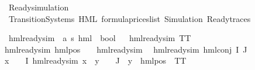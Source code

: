 %
\begin{isabellebody}%
%
%
\isadelimtheory
%
\endisadelimtheory
%
\isatagtheory
{}\isamarkupfalse%
\ Ready{\isacharunderscore}{\kern0pt}simulation\isanewline
{}\ Transition{\isacharunderscore}{\kern0pt}Systems\ HML\ formula{\isacharunderscore}{\kern0pt}prices{\isacharunderscore}{\kern0pt}list\ Simulation\ Ready{\isacharunderscore}{\kern0pt}traces\isanewline
{}%
\endisatagtheory
{\isafoldtheory}%
%
\isadelimtheory
%
\endisadelimtheory
%
\isadelimdocument
%
\endisadelimdocument
%
\isatagdocument
%
\isamarkuptrue%
%
\endisatagdocument
{\isafolddocument}%
%
\isadelimdocument
%
\endisadelimdocument
%
\begin{isamarkuptext}%
%
\end{isamarkuptext}\isamarkuptrue%
%
\begin{isamarkuptext}%
%
\end{isamarkuptext}\isamarkuptrue%
\isamarkupfalse%
\ hml{\isacharunderscore}{\kern0pt}ready{\isacharunderscore}{\kern0pt}sim\ {\isacharcolon}{\kern0pt}{\isacharcolon}{\kern0pt}\ {\isachardoublequoteopen}{\isacharparenleft}{\kern0pt}{\isacharprime}{\kern0pt}a{\isacharcomma}{\kern0pt}\ {\isacharprime}{\kern0pt}s{\isacharparenright}{\kern0pt}\ hml\ {\isasymRightarrow}\ bool{\isachardoublequoteclose}\isanewline
\ \ \isanewline
{\isachardoublequoteopen}hml{\isacharunderscore}{\kern0pt}ready{\isacharunderscore}{\kern0pt}sim\ TT{\isachardoublequoteclose}\ {\isacharbar}{\kern0pt}\isanewline
{\isachardoublequoteopen}hml{\isacharunderscore}{\kern0pt}ready{\isacharunderscore}{\kern0pt}sim\ {\isacharparenleft}{\kern0pt}hml{\isacharunderscore}{\kern0pt}pos\ {\isasymalpha}\ {\isasymphi}{\isacharparenright}{\kern0pt}{\isachardoublequoteclose}\ \ {\isachardoublequoteopen}hml{\isacharunderscore}{\kern0pt}ready{\isacharunderscore}{\kern0pt}sim\ {\isasymphi}{\isachardoublequoteclose}\ {\isacharbar}{\kern0pt}\isanewline
{\isachardoublequoteopen}hml{\isacharunderscore}{\kern0pt}ready{\isacharunderscore}{\kern0pt}sim\ {\isacharparenleft}{\kern0pt}hml{\isacharunderscore}{\kern0pt}conj\ I\ J\ {\isasymPhi}{\isacharparenright}{\kern0pt}{\isachardoublequoteclose}\ \ \isanewline
{\isachardoublequoteopen}{\isacharparenleft}{\kern0pt}{\isasymforall}x\ {\isasymin}\ {\isacharparenleft}{\kern0pt}{\isasymPhi}\ {\isacharbackquote}{\kern0pt}\ I{\isacharparenright}{\kern0pt}{\isachardot}{\kern0pt}\ hml{\isacharunderscore}{\kern0pt}ready{\isacharunderscore}{\kern0pt}sim\ x{\isacharparenright}{\kern0pt}\ {\isasymand}\ {\isacharparenleft}{\kern0pt}{\isasymforall}y\ {\isasymin}\ {\isacharparenleft}{\kern0pt}{\isasymPhi}\ {\isacharbackquote}{\kern0pt}\ J{\isacharparenright}{\kern0pt}{\isachardot}{\kern0pt}\ {\isacharparenleft}{\kern0pt}{\isasymexists}{\isasymalpha}{\isachardot}{\kern0pt}\ y\ {\isacharequal}{\kern0pt}\ {\isacharparenleft}{\kern0pt}hml{\isacharunderscore}{\kern0pt}pos\ {\isasymalpha}\ TT{\isacharparenright}{\kern0pt}{\isacharparenright}{\kern0pt}{\isacharparenright}{\kern0pt}{\isachardoublequoteclose}\isanewline

\end{isabellebody}
